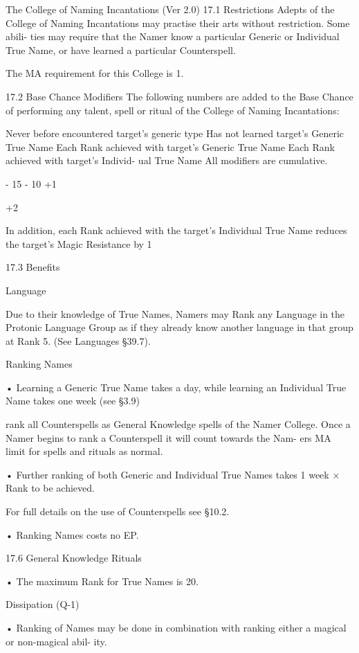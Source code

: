 \begin{Chapter}{The College of Naming Incantations (Ver 2.0)}
17.1 Restrictions 
Adepts of the College of Naming Incantations may 
practise  their  arts  without  restriction.  Some  abili-
ties  may  require  that  the  Namer  know  a  particular 
Generic  or  Individual  True  Name,  or  have  learned 
a particular Counterspell. 

The MA requirement for this College is 1. 

17.2 Base Chance Modifiers 
The  following  numbers  are  added  to  the  Base 
Chance  of  performing  any  talent,  spell  or  ritual  of 
the College of Naming Incantations: 

Never before encountered target’s generic 
type 
Has not learned target’s Generic True 
Name 
Each Rank achieved with target’s Generic 
True Name 
Each Rank achieved with target’s Individ-
ual True Name 
All modifiers are cumulative. 

-
15%
-
10%
+1%

+2%

In  addition,  each  Rank  achieved  with  the  target’s 
Individual  True  Name  reduces  the  target’s  Magic 
Resistance by 1%

17.3 Benefits 

Language 

Due  to  their  knowledge  of  True  Names,  Namers 
may Rank any Language in the Protonic Language 
Group as if they already know another language in 
that group at Rank 5. (See Languages §39.7). 

Ranking Names  

• Learning a Generic True Name takes a day, while 
learning  an  Individual  True  Name  takes  one  week 
(see §3.9)  

rank all Counterspells as General Knowledge spells 
of  the  Namer  College.  Once  a  Namer  begins  to 
rank a Counterspell it will count towards the Nam-
ers MA limit for spells and rituals as normal. 

•  Further  ranking  of  both  Generic  and  Individual 
True Names takes 1 week × Rank to be achieved.  

For  full  details  on  the  use  of  Counterspells  see 
§10.2. 

• Ranking Names costs no EP.  

17.6 General Knowledge Rituals 

• The maximum Rank for True Names is 20.  

Dissipation (Q-1) 

•  Ranking  of  Names  may  be  done  in  combination 
with ranking either a magical or non-magical abil-
ity.  


\end{Chapter}
